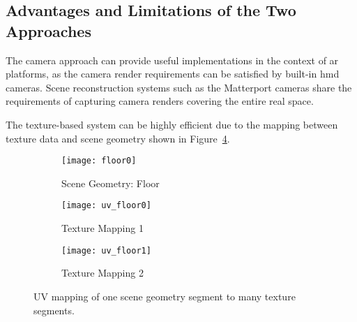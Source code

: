 \subsection{Advantages and Limitations of the Two Approaches}
The camera approach can provide useful implementations in the context of \acrshort{ar} platforms, as the camera render requirements can be satisfied by built-in \acrshort{hmd} cameras. Scene reconstruction systems such as the Matterport cameras \citep{chang2017matterport3d} share the requirements of capturing camera renders covering the entire real space. 

The texture-based system can be highly efficient due to the mapping between texture data and scene geometry shown in Figure~\ref{fig:uv_mapping_demo}.


\begin{figure}
    \centering
    \begin{subfigure}{0.75\textwidth}
        \texttt{[image: floor0]}
        \caption{Scene Geometry: Floor}
        \label{fig:floor}
    \end{subfigure}
    \hfill
    \begin{subfigure}{0.42\textwidth}
        \texttt{[image: uv\_floor0]}
        \caption{Texture Mapping 1}
        \label{fig:uv_floor}
    \end{subfigure}
    \hfill
    \begin{subfigure}{0.42\textwidth}
        \texttt{[image: uv\_floor1]}
        \caption{Texture Mapping 2}
        \label{fig:uv_floor2}
    \end{subfigure}
            
    \caption[Visualisation of the UV mapping process]{UV mapping of one scene geometry segment to many texture segments.}
    \label{fig:uv_mapping_demo}
\end{figure}


